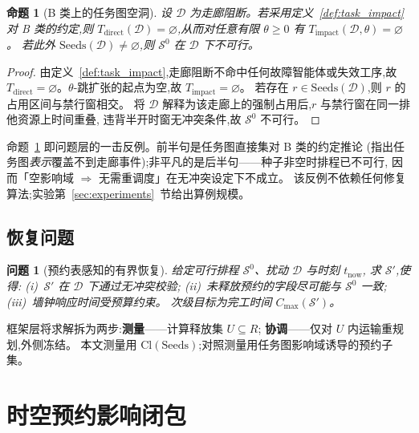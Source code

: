 \documentclass[manuscript,screen,review]{acmart}
\newtheorem{problem}{问题}
\newtheorem{prop}{命题}
\begin{document}
\begin{prop}[B 类上的任务图空洞]
\label{prop:miss}
设 \(\mathcal{D}\) 为走廊阻断。若采用定义~\ref{def:task_impact} 对 B 类的约定,则
\(T_{\mathrm{direct}}(\mathcal{D})=\varnothing\),从而对任意有限 \(\theta\ge 0\) 有
\(T_{\mathrm{impact}}(\mathcal{D},\theta)=\varnothing\)。
若此外 \(\mathrm{Seeds}(\mathcal{D})\neq\varnothing\),则 \(\mathcal{S}^0\) 在 \(\mathcal{D}\) 下不可行。
\end{prop}

\begin{proof}
由定义~\ref{def:task_impact},走廊阻断不命中任何故障智能体或失效工序,故
\(T_{\mathrm{direct}}=\varnothing\)。\(\theta\)-跳扩张的起点为空,故
\(T_{\mathrm{impact}}=\varnothing\)。
若存在 \(r\in\mathrm{Seeds}(\mathcal{D})\),则 \(r\) 的占用区间与禁行窗相交。
将 \(\mathcal{D}\) 解释为该走廊上的强制占用后,\(r\) 与禁行窗在同一排他资源上时间重叠,
违背半开时窗无冲突条件,故 \(\mathcal{S}^0\) 不可行。
\end{proof}

命题~\ref{prop:miss} 即问题层的一击反例。前半句是任务图直接集对 B 类的约定推论
(指出任务图\emph{表示}覆盖不到走廊事件);非平凡的是后半句——种子非空时排程已不可行,
因而「空影响域 \(\Rightarrow\) 无需重调度」在无冲突设定下不成立。
该反例不依赖任何修复算法;实验第~\ref{sec:experiments}~节给出算例规模。

\subsection{恢复问题}
\label{sec:recovery_problem}

\begin{problem}[预约表感知的有界恢复]
\label{prob:recovery}
给定可行排程 \(\mathcal{S}^0\)、扰动 \(\mathcal{D}\) 与时刻 \(t_{\mathrm{now}}\),
求 \(\mathcal{S}'\),使得:
(i)~\(\mathcal{S}'\) 在 \(\mathcal{D}\) 下通过无冲突校验;
(ii)~未释放预约的字段尽可能与 \(\mathcal{S}^0\) 一致;
(iii)~墙钟响应时间受预算约束。
次级目标为完工时间 \(C_{\max}(\mathcal{S}')\)。
\end{problem}

框架层将求解拆为两步:\textbf{测量}——计算释放集 \(U\subseteq R\);
\textbf{协调}——仅对 \(U\) 内运输重规划,外侧冻结。
本文测量用 \(\mathrm{Cl}(\mathrm{Seeds})\);对照测量用任务图影响域诱导的预约子集。

\section{时空预约影响闭包}
\label{sec:strc}
\end{document}
